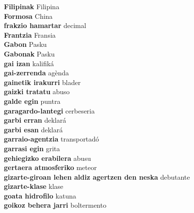 \textbf{ Filipinak  } Filipina \\
\textbf{ Formosa  } China \\
\textbf{ frakzio hamartar  } decimal \\
\textbf{ Frantzia  } Fransia \\
\textbf{ Gabon  } Pasku \\
\textbf{ Gabonak  } Pasku \\
\textbf{ gai izan  } kalifiká \\
\textbf{ gai-zerrenda  } agènda \\
\textbf{ gainetik irakurri  } blader \\
\textbf{ gaizki tratatu  } abuso \\
\textbf{ galde egin  } puntra \\
\textbf{ garagardo-lantegi  } cerbeseria \\
\textbf{ garbi erran  } deklará \\
\textbf{ garbi esan  } deklará \\
\textbf{ garraio-agentzia  } transportadó \\
\textbf{ garrasi egin  } grita \\
\textbf{ gehiegizko erabilera  } abusu \\
\textbf{ gertaera atmosferiko  } meteor \\
\textbf{ gizarte-giroan lehen aldiz agertzen den neska  } debutante \\
\textbf{ gizarte-klase  } klase \\
\textbf{ goata hidrofilo  } katuna \\
\textbf{ goikoz behera jarri  } boltermento \\
